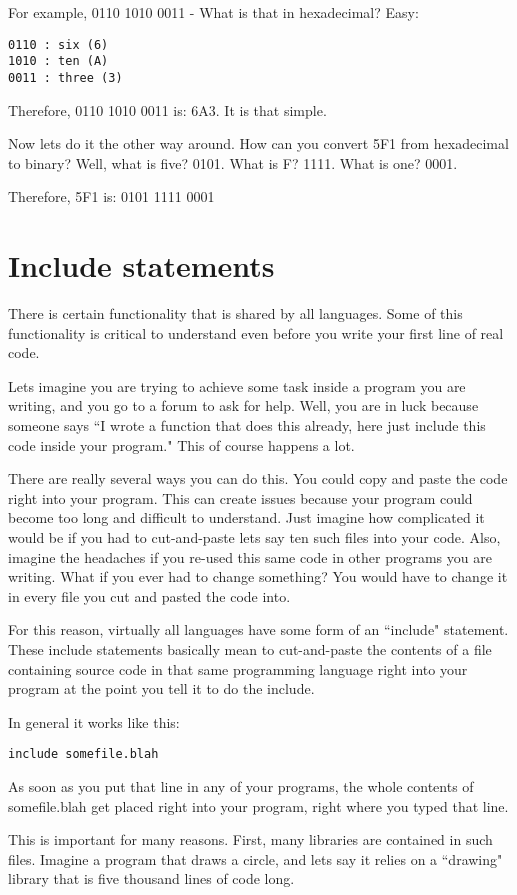 \documentclass[a4paper,12pt]{article}
\let\stdsection\section
\renewcommand\section{\newpage\stdsection}
\begin{document}
For example, 0110 1010 0011 - What is that in hexadecimal? Easy:
\begin{lstlisting}
0110 : six (6)
1010 : ten (A)
0011 : three (3)
\end{lstlisting}
Therefore, 0110 1010 0011 is: 6A3. It is that simple.

Now lets do it the other way around. How can you convert 5F1 from hexadecimal to binary? Well, what is five? 0101. What is F? 1111. What is one? 0001.

Therefore, 5F1 is: 0101 1111 0001

\section{Include statements}
There is certain functionality that is shared by all languages. Some of this functionality is critical to understand even before you write your first line of real code.

Lets imagine you are trying to achieve some task inside a program you are writing, and you go to a forum to ask for help. Well, you are in luck because someone says ``I wrote a function that does this already, here just include this code inside your program." This of course happens a lot.

There are really several ways you can do this. You could copy and paste the code right into your program. This can create issues because your program could become too long and difficult to understand. Just imagine how complicated it would be if you had to cut-and-paste lets say ten such files into your code. Also, imagine the headaches if you re-used this same code in other programs you are writing. What if you ever had to change something? You would have to change it in every file you cut and pasted the code into.

For this reason, virtually all languages have some form of an ``include" statement. These include statements basically mean to cut-and-paste the contents of a file containing source code in that same programming language right into your program at the point you tell it to do the include.

In general it works like this:
\begin{lstlisting}
include somefile.blah
\end{lstlisting}
As soon as you put that line in any of your programs, the whole contents of somefile.blah get placed right into your program, right where you typed that line.

This is important for many reasons. First, many libraries are contained in such files. Imagine a program that draws a circle, and lets say it relies on a ``drawing" library that is five thousand lines of code long.
\end{document}
